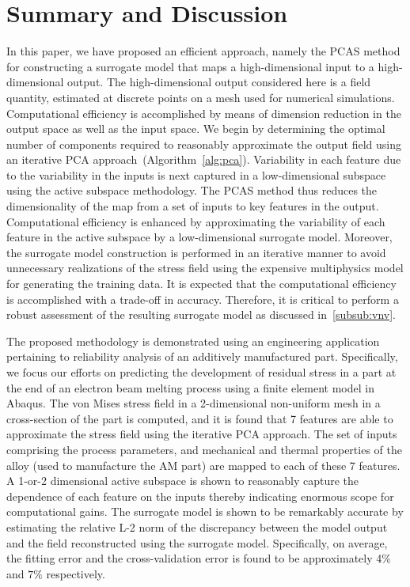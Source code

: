 \section{Summary and Discussion}
\label{sec:conc}

In this paper, we have proposed an efficient approach, namely the PCAS method for constructing a surrogate model that 
maps a high-dimensional input to a high-dimensional output. The high-dimensional output considered here is a field quantity,
estimated at discrete points on a mesh used for numerical simulations. Computational efficiency is
accomplished by means of dimension reduction in the output space as well as the input space.
We begin by determining the optimal number of
components required to reasonably approximate the output field using an iterative PCA approach~(Algorithm~\ref{alg:pca}).
Variability in each feature due to the variability
in the inputs is next captured in a low-dimensional subspace using the active subspace methodology.
The PCAS method thus reduces the dimensionality
of the map from a set of inputs to key features in the output. Computational efficiency is enhanced by 
approximating the variability of each feature in the active subspace by a low-dimensional surrogate model.
Moreover, the surrogate model construction is performed in an iterative manner to avoid unnecessary realizations 
of the stress field using the expensive multiphysics model for generating the training data. 
It is expected that the computational efficiency is accomplished with a trade-off in accuracy.
Therefore, it is critical to perform a robust assessment of the resulting surrogate model as discussed
in~\ref{subsub:vnv}. 

The proposed methodology is demonstrated using an engineering application pertaining to reliability analysis of
an additively manufactured part. Specifically, we focus our efforts on predicting the development of residual
stress in a part at the end of an electron beam melting process using a finite element model in Abaqus.
The von Mises stress field in a 2-dimensional non-uniform mesh
in a cross-section of the part is computed, and it is found that
7 features are able to approximate the stress field using the iterative PCA approach. The set of inputs
comprising the process parameters, and mechanical and thermal properties of the alloy (used to manufacture the
AM part) are mapped to each of these 7 features. A 1-or-2 dimensional active subspace is shown to reasonably
capture the dependence of each feature on the inputs thereby indicating enormous scope for computational gains.
The surrogate model is shown to be remarkably accurate by estimating the relative L-2 norm of the discrepancy
between the model output and the field reconstructed using the surrogate model. Specifically, on average, the
fitting error and the cross-validation error is found to be approximately 4$\%$ and $7\%$ respectively. 

